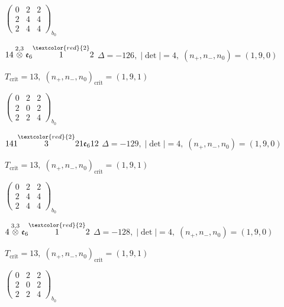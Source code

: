 \documentclass[10pt]{article}
\begin{document}
\hspace{2em}$\left(\begin{smallmatrix}0 & 2 & 2 \\ 2 & 4 & 4 \\ 2 & 4 & 4\end{smallmatrix}\right)_{\!b_0}$

\smallskip

$14\overset{2,3}{\otimes}\mathfrak{e}_6\overset{\textcolor{red}{2}}{1}2$ \quad $\Delta=-126,\; |\det|=4,\; (n_+,n_-,n_0)=(1,9,0)$

\hspace{1em}$T_{\text{crit}}=13,\; (n_+,n_-,n_0)_{\text{crit}}=(1,9,1)$

\hspace{2em}$\left(\begin{smallmatrix}0 & 2 & 2 \\ 2 & 0 & 2 \\ 2 & 2 & 4\end{smallmatrix}\right)_{\!b_0}$

$141\overset{\textcolor{red}{2}}{3}21\mathfrak{e}_612$ \quad $\Delta=-129,\; |\det|=4,\; (n_+,n_-,n_0)=(1,9,0)$

\hspace{1em}$T_{\text{crit}}=13,\; (n_+,n_-,n_0)_{\text{crit}}=(1,9,1)$

\hspace{2em}$\left(\begin{smallmatrix}0 & 2 & 2 \\ 2 & 4 & 4 \\ 2 & 4 & 4\end{smallmatrix}\right)_{\!b_0}$

\smallskip

$4\overset{3,3}{\otimes}\mathfrak{e}_6\overset{\textcolor{red}{2}}{1}2$ \quad $\Delta=-128,\; |\det|=4,\; (n_+,n_-,n_0)=(1,9,0)$

\hspace{1em}$T_{\text{crit}}=13,\; (n_+,n_-,n_0)_{\text{crit}}=(1,9,1)$

\hspace{2em}$\left(\begin{smallmatrix}0 & 2 & 2 \\ 2 & 0 & 2 \\ 2 & 2 & 4\end{smallmatrix}\right)_{\!b_0}$

\smallskip
\end{document}

